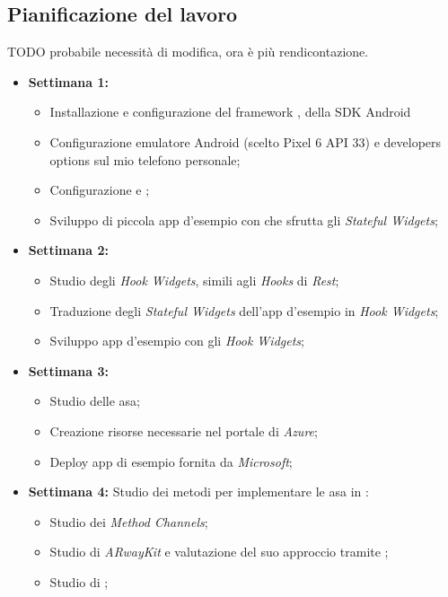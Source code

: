 \subsection{Pianificazione del lavoro}
TODO probabile necessità di modifica, ora è più rendicontazione.
\begin{itemize}
    \item \textbf{Settimana 1:} 
        \begin{itemize}
            \item Installazione e configurazione del framework \flutter, della SDK Android 
            \item Configurazione emulatore Android (scelto Pixel 6 API 33) e 
            developers options sul mio telefono personale;
            \item Configurazione \vsc e \astudio;
            \item Sviluppo di piccola app d'esempio con \flutter che sfrutta gli \textit{Stateful Widgets};
        \end{itemize} 
    \item \textbf{Settimana 2:} 
        \begin{itemize}
            \item Studio degli \textit{Hook Widgets}, simili agli \textit{Hooks} di \textit{Rest};
            \item Traduzione degli \textit{Stateful Widgets} dell'app d'esempio in \textit{Hook Widgets};
            \item Sviluppo app d'esempio con gli \textit{Hook Widgets};
        \end{itemize}
    \item \textbf{Settimana 3:} 
        \begin{itemize}
            \item Studio delle asa;
            \item Creazione risorse necessarie nel portale di \textit{Azure};
            \item Deploy app di esempio fornita da \textit{Microsoft};
        \end{itemize}
    \item \textbf{Settimana 4:} Studio dei metodi per implementare le asa in \flutter:
        \begin{itemize}
            \item Studio dei \textit{Method Channels};
            \item Studio di \textit{ARwayKit} e valutazione del suo approccio tramite \unity;
            \item Studio di \arplug;

\end{itemize}
\end{itemize}
